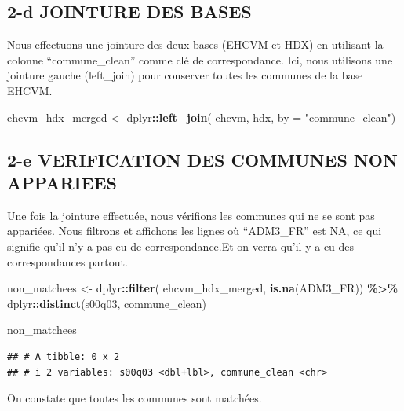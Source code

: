 \documentclass[
]{article}
\newenvironment{Shaded}{\begin{snugshade}}{\end{snugshade}}
\newcommand{\AttributeTok}[1]{\textcolor[rgb]{0.13,0.29,0.53}{#1}}
\newcommand{\FunctionTok}[1]{\textcolor[rgb]{0.13,0.29,0.53}{\textbf{#1}}}
\newcommand{\NormalTok}[1]{#1}
\newcommand{\OtherTok}[1]{\textcolor[rgb]{0.56,0.35,0.01}{#1}}
\newcommand{\SpecialCharTok}[1]{\textcolor[rgb]{0.81,0.36,0.00}{\textbf{#1}}}
\newcommand{\StringTok}[1]{\textcolor[rgb]{0.31,0.60,0.02}{#1}}
\begin{document}
\subsection{2-d JOINTURE DES BASES}\label{d-jointure-des-bases}

Nous effectuons une jointure des deux bases (EHCVM et HDX) en utilisant
la colonne ``commune\_clean'' comme clé de correspondance. Ici, nous
utilisons une jointure gauche (left\_join) pour conserver toutes les
communes de la base EHCVM.

\begin{Shaded}
\begin{Highlighting}[]
\NormalTok{ehcvm\_hdx\_merged }\OtherTok{\textless{}{-}}\NormalTok{ dplyr}\SpecialCharTok{::}\FunctionTok{left\_join}\NormalTok{(}
\NormalTok{  ehcvm, hdx, }\AttributeTok{by =} \StringTok{"commune\_clean"}\NormalTok{)}
\end{Highlighting}
\end{Shaded}

\subsection{2-e VERIFICATION DES COMMUNES NON
APPARIEES}\label{e-verification-des-communes-non-appariees}

Une fois la jointure effectuée, nous vérifions les communes qui ne se
sont pas appariées. Nous filtrons et affichons les lignes où
``ADM3\_FR'' est NA, ce qui signifie qu'il n'y a pas eu de
correspondance.Et on verra qu'il y a eu des correspondances partout.

\begin{Shaded}
\begin{Highlighting}[]
\NormalTok{non\_matchees }\OtherTok{\textless{}{-}}\NormalTok{ dplyr}\SpecialCharTok{::}\FunctionTok{filter}\NormalTok{(}
\NormalTok{  ehcvm\_hdx\_merged, }\FunctionTok{is.na}\NormalTok{(ADM3\_FR)) }\SpecialCharTok{\%\textgreater{}\%} 
\NormalTok{  dplyr}\SpecialCharTok{::}\FunctionTok{distinct}\NormalTok{(s00q03, commune\_clean) }

\NormalTok{non\_matchees}
\end{Highlighting}
\end{Shaded}

\begin{verbatim}
## # A tibble: 0 x 2
## # i 2 variables: s00q03 <dbl+lbl>, commune_clean <chr>
\end{verbatim}

On constate que toutes les communes sont matchées.
\end{document}

